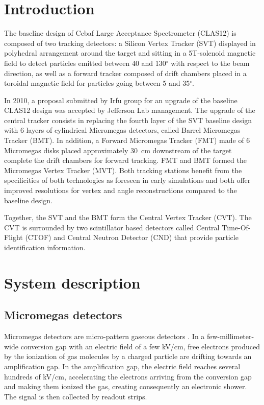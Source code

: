 \section{Introduction}
The baseline design of Cebaf Large Acceptance Spectrometer (CLAS12)\cite{nim:clas12} is composed of two tracking detectors: a Silicon Vertex Tracker (SVT) \cite{nim:svt} displayed in polyhedral 
arrangement around the target and sitting in a 5T-solenoid magnetic field to detect particles emitted between 40 and 130$^{\circ}$ with respect to the beam direction, as well as a forward tracker composed of drift chambers placed in a toroidal magnetic field for particles going between 5 and 35$^{\circ}$. 

In 2010, a proposal submitted by Irfu group for an upgrade of the baseline CLAS12 design was accepted by Jefferson Lab management. The upgrade of the central tracker consists in replacing the fourth layer of the SVT baseline design with 6 layers of cylindrical Micromegas detectors, called Barrel Micromegas Tracker (BMT). In addition, a Forward Micromegas Tracker (FMT) made of 6 Micromegas disks placed approximately 30~cm downstream of the target complete the drift chambers for forward tracking. FMT and BMT formed the Micromegas Vertex Tracker (MVT). Both tracking stations benefit from the specificities of both technologies as foreseen in early simulations and both offer improved resolutions for vertex and angle reconstructions compared to the baseline design. 

Together, the SVT and the BMT form the Central Vertex Tracker (CVT). The CVT is surrounded by two scintillator based detectors called Central Time-Of-Flight (CTOF) \cite{nim:ctof} and Central Neutron Detector (CND) \cite{nim:cnd} that provide particle identification information.

\section{System description}

\subsection{Micromegas detectors}
Micromegas detectors are micro-pattern gaseous detectors \cite{GIOMATARIS199629}. In a few-millimeter-wide conversion gap with an electric field of a few kV/cm, free electrons produced by the ionization of gas molecules by a charged particle are drifting towards an amplification gap. In the amplification gap, the electric field reaches several hundreds of kV/cm, accelerating the electrons arriving from the conversion gap and making them ionized the gas, creating consequently an electronic shower. The signal is then collected by readout strips.  


